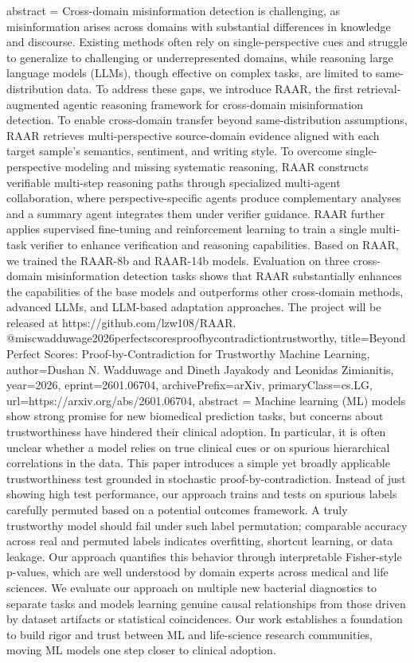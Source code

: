 {      abstract = {Cross-domain misinformation detection is challenging, as misinformation arises across domains with substantial differences in knowledge and discourse. Existing methods often rely on single-perspective cues and struggle to generalize to challenging or underrepresented domains, while reasoning large language models (LLMs), though effective on complex tasks, are limited to same-distribution data. To address these gaps, we introduce RAAR, the first retrieval-augmented agentic reasoning framework for cross-domain misinformation detection. To enable cross-domain transfer beyond same-distribution assumptions, RAAR retrieves multi-perspective source-domain evidence aligned with each target sample's semantics, sentiment, and writing style. To overcome single-perspective modeling and missing systematic reasoning, RAAR constructs verifiable multi-step reasoning paths through specialized multi-agent collaboration, where perspective-specific agents produce complementary analyses and a summary agent integrates them under verifier guidance. RAAR further applies supervised fine-tuning and reinforcement learning to train a single multi-task verifier to enhance verification and reasoning capabilities. Based on RAAR, we trained the RAAR-8b and RAAR-14b models. Evaluation on three cross-domain misinformation detection tasks shows that RAAR substantially enhances the capabilities of the base models and outperforms other cross-domain methods, advanced LLMs, and LLM-based adaptation approaches. The project will be released at https://github.com/lzw108/RAAR.}
}@misc{wadduwage2026perfectscoresproofbycontradictiontrustworthy,
      title={Beyond Perfect Scores: Proof-by-Contradiction for Trustworthy Machine Learning}, 
      author={Dushan N. Wadduwage and Dineth Jayakody and Leonidas Zimianitis},
      year={2026},
      eprint={2601.06704},
      archivePrefix={arXiv},
      primaryClass={cs.LG},
      url={https://arxiv.org/abs/2601.06704},
      abstract = {Machine learning (ML) models show strong promise for new biomedical prediction tasks, but concerns about trustworthiness have hindered their clinical adoption. In particular, it is often unclear whether a model relies on true clinical cues or on spurious hierarchical correlations in the data. This paper introduces a simple yet broadly applicable trustworthiness test grounded in stochastic proof-by-contradiction. Instead of just showing high test performance, our approach trains and tests on spurious labels carefully permuted based on a potential outcomes framework. A truly trustworthy model should fail under such label permutation; comparable accuracy across real and permuted labels indicates overfitting, shortcut learning, or data leakage. Our approach quantifies this behavior through interpretable Fisher-style p-values, which are well understood by domain experts across medical and life sciences. We evaluate our approach on multiple new bacterial diagnostics to separate tasks and models learning genuine causal relationships from those driven by dataset artifacts or statistical coincidences. Our work establishes a foundation to build rigor and trust between ML and life-science research communities, moving ML models one step closer to clinical adoption.}
}
